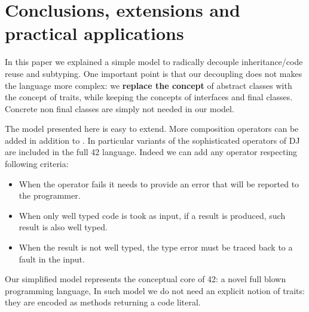 \saveSpace\saveSpace
\section{Conclusions, extensions and practical applications}
\saveSpace
In this paper we explained a simple model to 
radically decouple inheritance/code reuse and subtyping.
One important point is that our decoupling does not
makes the language more complex:
we \textbf{replace the concept} of abstract classes with
the concept of traits, while keeping the concepts of
interfaces and final classes.
Concrete non final classes are simply not needed in our model.

The model presented here is easy to extend.
More composition operators can be added in addition to \use.
In particular variants of the sophisticated operators of DJ are
included in the full 42 language.
 Indeed we can add any operator respecting following criteria:

\begin{itemize}
\item When the operator fails it needs to provide an error that will be reported to the programmer.
\item When only well typed code is took as input, if a result is produced,
 such result is also well typed.
\item When the result is not well typed,
the type error must be traced back to
a fault in the input.
 \end{itemize}
 

 
Our simplified model represents the conceptual core of  42: a novel full blown programming language,
In such model we do not need an explicit notion of traits: they are encoded as methods returning a code literal.
\begin{comment}
using the ideas presented in this paper to obtain reliable and understandable metaprogramming.
Formalization (in progress) for full 42 can be found at
\url{http://}\footnote{Omitted for anonymous review}. 
42 extends our model allowing
flattening to execute arbitrary computations.
In such model we do not need an explicit notion of traits: they are encoded as methods returning a code literal.
42 also has features less related to code composition, like
  a strong type system supporting aliasing mutability and circularity control,
   checked exceptions, and errors (unchecked exceptions) with strong-exception-safety.


42 do not have a finite set of composition operators; they can be
added using the built in support for native method calls. They can
be dynamically checked to verify that they are well behaved
according to our predicate, or they can be trusted to achieve
efficiency.
\end{comment}

